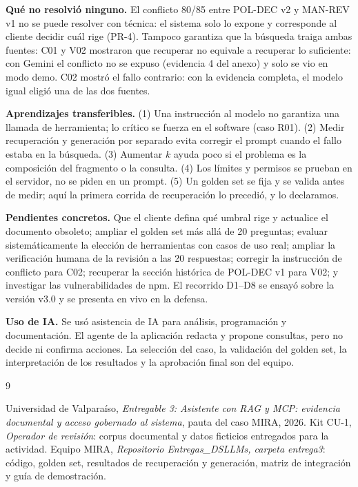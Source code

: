 \documentclass[11pt,a4paper]{article}
\begin{document}
\textbf{Qué no resolvió ninguno.} El conflicto 80/85 entre POL-DEC v2 y MAN-REV v1 no se puede resolver con técnica: el sistema solo lo expone y corresponde al cliente decidir cuál rige (PR-4). Tampoco garantiza que la búsqueda traiga ambas fuentes: C01 y V02 mostraron que recuperar no equivale a recuperar lo suficiente: con Gemini el conflicto no se expuso (evidencia 4 del anexo) y solo se vio en modo demo. C02 mostró el fallo contrario: con la evidencia completa, el modelo igual eligió una de las dos fuentes.

\textbf{Aprendizajes transferibles.} (1) Una instrucción al modelo no garantiza una llamada de herramienta; lo crítico se fuerza en el software (caso R01). (2) Medir recuperación y generación por separado evita corregir el prompt cuando el fallo estaba en la búsqueda. (3) Aumentar $k$ ayuda poco si el problema es la composición del fragmento o la consulta. (4) Los límites y permisos se prueban en el servidor, no se piden en un prompt. (5) Un golden set se fija y se valida antes de medir; aquí la primera corrida de recuperación lo precedió, y lo declaramos.

\textbf{Pendientes concretos.} Que el cliente defina qué umbral rige y actualice el documento obsoleto; ampliar el golden set más allá de 20 preguntas; evaluar sistemáticamente la elección de herramientas con casos de uso real; ampliar la verificación humana de la revisión a las 20 respuestas; corregir la instrucción de conflicto para C02; recuperar la sección histórica de POL-DEC v1 para V02; y investigar las vulnerabilidades de npm. El recorrido D1--D8 se ensayó sobre la versión v3.0 y se presenta en vivo en la defensa.

\textbf{Uso de IA.} Se usó asistencia de IA para análisis, programación y documentación. El agente de la aplicación redacta y propone consultas, pero no decide ni confirma acciones. La selección del caso, la validación del golden set, la interpretación de los resultados y la aprobación final son del equipo.

\begin{thebibliography}{9}
\small
{}
 Universidad de Valparaíso, \emph{Entregable 3: Asistente con RAG y MCP: evidencia documental y acceso gobernado al sistema}, pauta del caso MIRA, 2026.
 Kit CU-1, \emph{Operador de revisión}: corpus documental y datos ficticios entregados para la actividad.
 Equipo MIRA, \emph{Repositorio Entregas\_DSLLMs, carpeta entrega3}: código, golden set, resultados de recuperación y generación, matriz de integración y guía de demostración.
\end{thebibliography}
\end{document}
